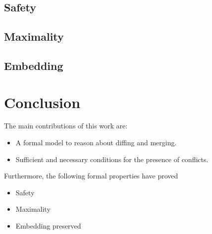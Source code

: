 \documentclass[../Thesis.tex]{subfiles}
\begin{document}
	\subsection{Safety}
	\label{subsec:Safety}

	\subsection{Maximality}
	\label{subsec:Maximality}

	\subsection{Embedding}
	\label{subsec:Embedding}

\section{Conclusion}

The main contributions of this work are:
\begin{itemize}
	\item A formal model to reason about diffing and merging.
	\item Sufficient and necessary conditions for the presence of conflicts.
\end{itemize}
	
Furthermore, the following formal properties 	have proved
\begin{itemize}
	\item Safety
	\item Maximality
	\item Embedding preserved
\end{itemize}
\end{document}
